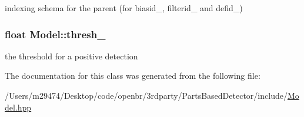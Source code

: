 indexing schema for the parent (for biasid\-\_\-, filterid\-\_\- and defid\-\_\-) 

\hypertarget{class_model_ac2263c14bbd27a5fed433494354e2b02}{
\subsubsection[{thresh\-\_\-}]{\setlength{\rightskip}{0pt plus 5cm}float Model\-::thresh\-\_\-\hspace{0.3cm}{\ttfamily [protected]}}}\label{class_model_ac2263c14bbd27a5fed433494354e2b02}


the threshold for a positive detection 



The documentation for this class was generated from the following file\-:\begin{DoxyCompactItemize}
\item 
/\-Users/m29474/\-Desktop/code/openbr/3rdparty/\-Parts\-Based\-Detector/include/\hyperlink{_model_8hpp}{Model.\-hpp}\end{DoxyCompactItemize}

